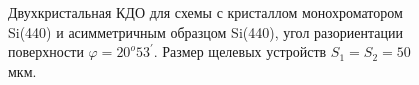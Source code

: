   \begin{figure}[H]
    \centering
    \hfill
    \caption{Двухкристальная КДО для схемы с кристаллом монохроматором Si(440) и асимметричным образцом Si(440),
    угол разориентации поверхности $\varphi = 20^o53^{'}$. Размер щелевых устройств $S_1 = S_2 = 50$ мкм.}
    \label{ris:assymetric_exp_50}
  \end{figure}
